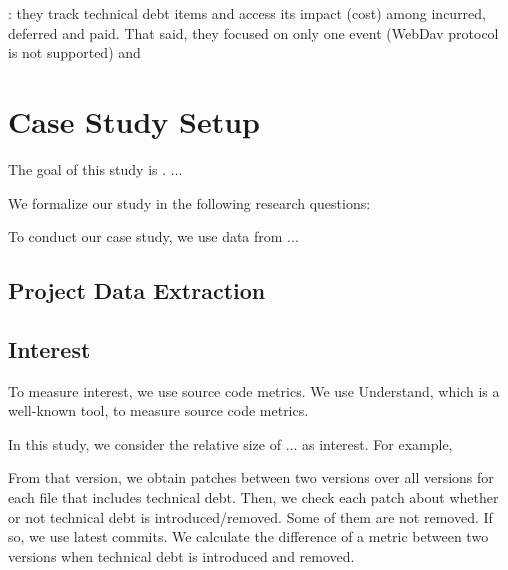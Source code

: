 \documentclass[conference]{IEEEtran}
\begin{document}
\cite{Guo2011ICSM}: they track technical debt items and access its impact (cost) among incurred, deferred and paid. That said, they focused on only one event (WebDav protocol is not supported) and 


\section{Case Study Setup}
The goal of this study is .
...

We formalize our study in the following research questions:


To conduct our case study, we use data from ...


\subsection{Project Data Extraction}

\para{}

\subsection{Interest}
To measure interest, we use source code metrics. We use Understand, which is a well-known tool, to measure source code metrics. 


In this study, we consider the relative size of ... as interest. For example, 

From that version, we obtain patches between two versions over all versions for each file that includes technical debt. Then, we check each patch about whether or not technical debt is introduced/removed. Some of them are not removed. If so, we use latest commits. We calculate the difference of a metric between two versions when technical debt is introduced and removed.

\end{document}
